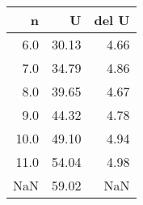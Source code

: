 \begin{tabular}{rrr}
\toprule
   n &     U &  del U \\
\midrule
 6.0 & 30.13 &   4.66 \\
 7.0 & 34.79 &   4.86 \\
 8.0 & 39.65 &   4.67 \\
 9.0 & 44.32 &   4.78 \\
10.0 & 49.10 &   4.94 \\
11.0 & 54.04 &   4.98 \\
 NaN & 59.02 &    NaN \\
\bottomrule
\end{tabular}
